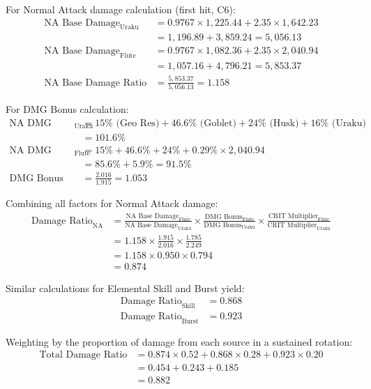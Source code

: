 \documentclass[12pt,a4paper]{article}
\begin{document}
For Normal Attack damage calculation (first hit, C6):
\begin{align}
\text{NA Base Damage}_{\text{Uraku}} &= 0.9767 \times 1,225.44 + 2.35 \times 1,642.23 \\
&= 1,196.89 + 3,859.24 = 5,056.13 \\
\text{NA Base Damage}_{\text{Flute}} &= 0.9767 \times 1,082.36 + 2.35 \times 2,040.94 \\
&= 1,057.16 + 4,796.21 = 5,853.37 \\
\text{NA Base Damage Ratio} &= \frac{5,853.37}{5,056.13} = 1.158
\end{align}

For DMG Bonus calculation:
\begin{align}
\text{NA DMG Bonus}_{\text{Uraku}} &= 15\% \text{ (Geo Res)} + 46.6\% \text{ (Goblet)} + 24\% \text{ (Husk)} + 16\% \text{ (Uraku)} \\
&= 101.6\% \\
\text{NA DMG Bonus}_{\text{Flute}} &= 15\% + 46.6\% + 24\% + 0.29\% \times 2,040.94 \\
&= 85.6\% + 5.9\% = 91.5\% \\
\text{DMG Bonus Ratio} &= \frac{2.016}{1.915} = 1.053
\end{align}

Combining all factors for Normal Attack damage:
\begin{align}
\text{Damage Ratio}_{\text{NA}} &= \frac{\text{NA Base Damage}_{\text{Flute}}}{\text{NA Base Damage}_{\text{Uraku}}} \times \frac{\text{DMG Bonus}_{\text{Flute}}}{\text{DMG Bonus}_{\text{Uraku}}} \times \frac{\text{CRIT Multiplier}_{\text{Flute}}}{\text{CRIT Multiplier}_{\text{Uraku}}} \\
&= 1.158 \times \frac{1.915}{2.016} \times \frac{1.785}{2.249} \\
&= 1.158 \times 0.950 \times 0.794 \\
&= 0.874
\end{align}

Similar calculations for Elemental Skill and Burst yield:
\begin{align}
\text{Damage Ratio}_{\text{Skill}} &= 0.868 \\
\text{Damage Ratio}_{\text{Burst}} &= 0.923
\end{align}

Weighting by the proportion of damage from each source in a sustained rotation:
\begin{align}
\text{Total Damage Ratio} &= 0.874 \times 0.52 + 0.868 \times 0.28 + 0.923 \times 0.20 \\
&= 0.454 + 0.243 + 0.185 \\
&= 0.882
\end{align}
\end{document}
